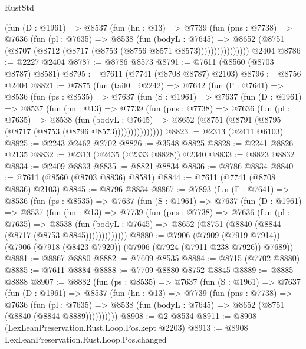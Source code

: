 \begin{lexlean}{RustStd}
\begin{coremodule}
              (fun (D : @1961) =>
              @8537
                (fun (hn : @13) =>
                @7739
                  (fun (pns : @7738) =>
                  @7636
                    (fun (pl : @7635) =>
                    @8538
                      (fun (bodyL : @7645) =>
                      @8652 (@8751 (@8707 (@8712 (@8717 (@8753 (@8756 @8571 @8573))))))))))))))))
    @2404
@8786 := @2227 @2404
@8787 := @8786 @8573
@8791 := @7611 (@8560 (@8703 @8787) @8581)
@8795 := @7611 (@7741 (@8708 @8787) @2103)
@8796 := @8756 @2404
@8821 := @7875
    (fun (tail0 : @2242) =>
    @7642
      (fun (Γ : @7641) =>
      @8536
        (fun (ps : @8535) =>
        @7637
          (fun (S : @1961) =>
          @7637
            (fun (D : @1961) =>
            @8537
              (fun (hn : @13) =>
              @7739
                (fun (pns : @7738) =>
                @7636
                  (fun (pl : @7635) =>
                  @8538
                    (fun (bodyL : @7645) =>
                    @8652 (@8751 (@8791 (@8795 (@8717 (@8753 (@8796 @8573)))))))))))))))
@8823 := @2313 (@2411 @6103)
@8825 := @2243 @2462 @2702
@8826 := @3548 @8825
@8828 := @2241 @8826 @2135
@8832 := @2313 (@2435 (@2333 @8828)) @2340
@8833 := @8823 @8832
@8834 := @2409 @8833
@8835 := @8821 @8834
@8836 := @8786 @8834
@8840 := @7611 (@8560 (@8703 @8836) @8581)
@8844 := @7611 (@7741 (@8708 @8836) @2103)
@8845 := @8796 @8834
@8867 := @7893
    (fun (Γ : @7641) =>
    @8536
      (fun (ps : @8535) =>
      @7637
        (fun (S : @1961) =>
        @7637
          (fun (D : @1961) =>
          @8537
            (fun (hn : @13) =>
            @7739
              (fun (pns : @7738) =>
              @7636
                (fun (pl : @7635) =>
                @8538
                  (fun (bodyL : @7645) =>
                  @8652 (@8751 (@8840 (@8844 (@8717 (@8753 @8845)))))))))))))
@8880 := @7906
    (@7909 (@7919 @7914))
    (@7906 (@7918 (@8423 @7920)) (@7906 (@7924 (@7911 @238 @7926)) @7689))
@8881 := @8867 @8880
@8882 := @7609 @8535
@8884 := @8715 (@7702 @8880)
@8885 := @7611 @8884
@8888 := @7709 @8880 @8752 @8845
@8889 := @8885 @8888
@8907 := @8882
    (fun (ps : @8535) =>
    @7637
      (fun (S : @1961) =>
      @7637
        (fun (D : @1961) =>
        @8537
          (fun (hn : @13) =>
          @7739
            (fun (pns : @7738) =>
            @7636
              (fun (pl : @7635) =>
              @8538 (fun (bodyL : @7645) => @8652 (@8751 (@8840 (@8844 @8889))))))))))
@8908 := @2 @8534
@8911 := @8908 (LexLeanPreservation.Rust.Loop.Pos.kept @2203)
@8913 := @8908 LexLeanPreservation.Rust.Loop.Pos.changed

\end{coremodule}
\end{lexlean}
